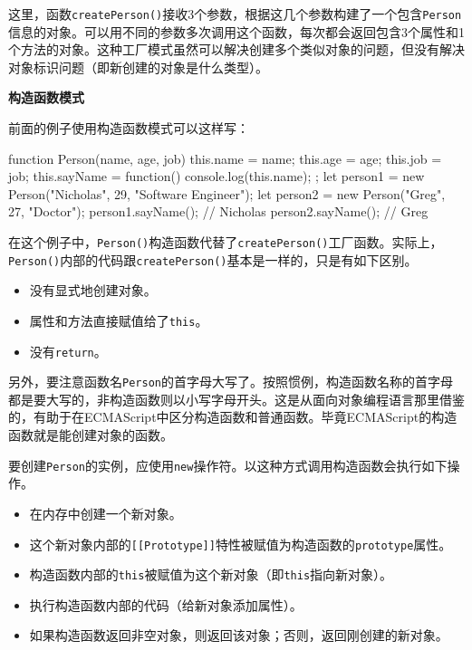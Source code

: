 这里，函数\texttt{createPerson()}接收3个参数，根据这几个参数构建了一个包含\texttt{Person}信息的对象。可以用不同的参数多次调用这个函数，每次都会返回包含3个属性和1个方法的对象。这种工厂模式虽然可以解决创建多个类似对象的问题，但没有解决对象标识问题（即新创建的对象是什么类型）。

\noindent\textbf{构造函数模式}

前面的例子使用构造函数模式可以这样写：

\begin{JavaScript}
function Person(name, age, job){    
    this.name = name;   
    this.age = age;   
    this.job = job;   
    this.sayName = function() {     
        console.log(this.name);   
    }; 
} 
let person1 = new Person("Nicholas", 29, "Software Engineer"); 
let person2 = new Person("Greg", 27, "Doctor"); 
person1.sayName();  // Nicholas 
person2.sayName();  // Greg 
\end{JavaScript}

在这个例子中，\texttt{Person()}构造函数代替了\texttt{createPerson()}工厂函数。实际上，\texttt{Person()}内部的代码跟\texttt{createPerson()}基本是一样的，只是有如下区别。

\begin{itemize}
    \item 没有显式地创建对象。
    \item 属性和方法直接赋值给了\texttt{this}。
    \item 没有\texttt{return}。
\end{itemize}

另外，要注意函数名\texttt{Person}的首字母大写了。按照惯例，构造函数名称的首字母都是要大写的，非构造函数则以小写字母开头。这是从面向对象编程语言那里借鉴的，有助于在ECMAScript中区分构造函数和普通函数。毕竟ECMAScript的构造函数就是能创建对象的函数。

要创建\texttt{Person}的实例，应使用\texttt{new}操作符。以这种方式调用构造函数会执行如下操作。

\begin{itemize}
    \item 在内存中创建一个新对象。
    \item 这个新对象内部的\texttt{[[Prototype]]}特性被赋值为构造函数的\texttt{prototype}属性。
    \item 构造函数内部的\texttt{this}被赋值为这个新对象（即\texttt{this}指向新对象）。
    \item 执行构造函数内部的代码（给新对象添加属性）。
    \item 如果构造函数返回非空对象，则返回该对象；否则，返回刚创建的新对象。
\end{itemize}

